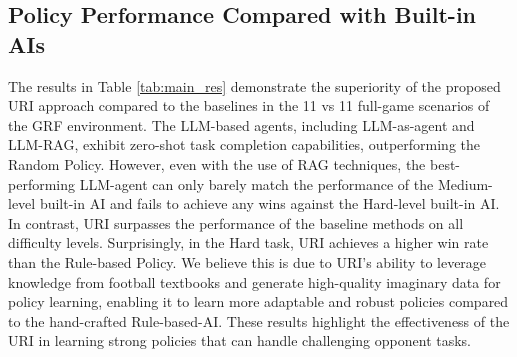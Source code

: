\subsection{Policy Performance Compared with Built-in AIs}

 The results in Table \ref{tab:main_res} demonstrate the superiority of the proposed URI approach compared to the baselines in the 11 vs 11 full-game scenarios of the GRF environment. The LLM-based agents, including LLM-as-agent and LLM-RAG, exhibit zero-shot task completion capabilities, outperforming the Random Policy. However, even with the use of RAG techniques, the best-performing LLM-agent can only barely match the performance of the Medium-level built-in AI and fails to achieve any wins against the Hard-level built-in AI. In contrast, URI surpasses the performance of the baseline methods on all difficulty levels. Surprisingly, in the Hard task, URI achieves a higher win rate than the Rule-based Policy. We believe this is due to URI's ability to leverage knowledge from football textbooks and generate high-quality imaginary data for policy learning, enabling it to learn more adaptable and robust policies compared to the hand-crafted Rule-based-AI. These results highlight the effectiveness of the URI in learning strong policies that can handle challenging opponent tasks.





